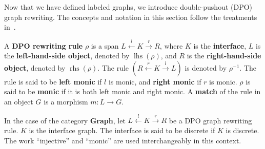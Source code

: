 Now that we have defined labeled graphs, we introduce double-pushout (DPO) graph rewriting. The concepts and notation in this section follow the treatments in~\cite{endrullis2024generalized_icgt}.
\begin{definition} 
  \label{def:grs:dpo_rule}
A \textbf{DPO rewriting rule} $\rho$ is a span \( L \overset{l}{\leftarrow} K \overset{r}{\rightarrow} R \), where \( K \) is the \textbf{interface}, \( L \) is the \textbf{left-hand-side object}, denoted by \( \operatorname{lhs}(\rho) \), and \( R \) is the \textbf{right-hand-side object}, denoted by \( \operatorname{rhs}(\rho) \). The rule $(R \overset{r}{\leftarrow} K \overset{l}{\rightarrow} L)$ is denoted by $\rho^{-1}$. The rule is said to be \textbf{left monic} if \( l \) is monic, and \textbf{right monic} if \( r \) is monic. 
$\rho$ is said to be \textbf{monic} if it is both left monic and right monic.
A \textbf{match} of the rule in an object \( G \) is a morphism \( m: L \rightarrow G \). 
\end{definition}
In the case of the category \textbf{Graph}, 
let \( L \overset{l}{\leftarrow} K \overset{r}{\rightarrow} R \) be a DPO graph rewriting rule. $K$ is the interface graph. The interface is said to be discrete if $K$ is discrete.
The work \enquote{injective} and \enquote{monic} are used interchangeably in this context.

